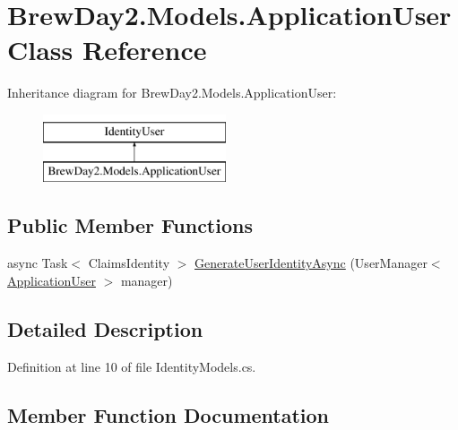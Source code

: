 \hypertarget{class_brew_day2_1_1_models_1_1_application_user}{}\section{Brew\+Day2.\+Models.\+Application\+User Class Reference}
\label{class_brew_day2_1_1_models_1_1_application_user}
Inheritance diagram for Brew\+Day2.\+Models.\+Application\+User\+:\begin{figure}[H]
\begin{center}
\leavevmode
\includegraphics[height=2.000000cm]{class_brew_day2_1_1_models_1_1_application_user}
\end{center}
\end{figure}
\subsection*{Public Member Functions}
\begin{DoxyCompactItemize}
\item 
async Task$<$ Claims\+Identity $>$ \mbox{\hyperlink{class_brew_day2_1_1_models_1_1_application_user_af69453f99f735666ebd6f8d49be863e2}{Generate\+User\+Identity\+Async}} (User\+Manager$<$ \mbox{\hyperlink{class_brew_day2_1_1_models_1_1_application_user}{Application\+User}} $>$ manager)
\end{DoxyCompactItemize}


\subsection{Detailed Description}


Definition at line 10 of file Identity\+Models.\+cs.



\subsection{Member Function Documentation}
\mbox{\label{class_brew_day2_1_1_models_1_1_application_user_af69453f99f735666ebd6f8d49be863e2}} 
